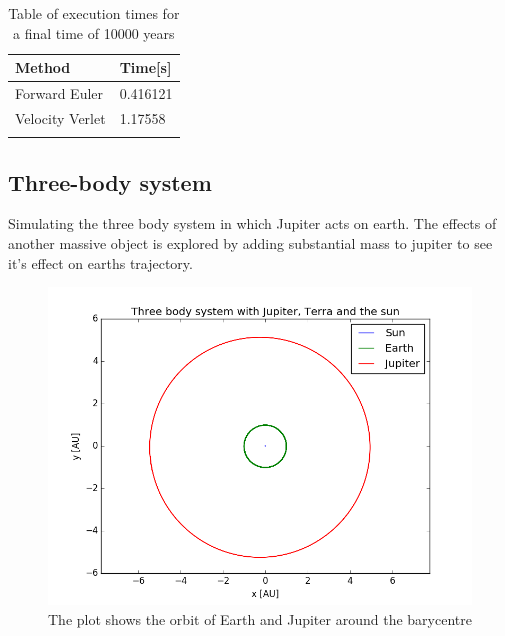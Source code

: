 \begin{table}
\centering
\caption{Table of execution times for a final time of 10000 years}
\begin{tabular}{|l|l|}
\hline
\textbf{Method}  & \textbf{Time[s]} \\
\hline
Forward Euler   & 0.416121 \\
\hline
Velocity Verlet & 1.17558 \\
\hline
\label{tab:comp-time}
\end{tabular}
\end{table}

\subsection{Three-body system}
Simulating the three body system in which Jupiter acts on earth. The effects of another massive object is explored by adding substantial mass to jupiter to see it's effect on earths trajectory.
 
\begin{figure}[H]
\includegraphics[scale=0.7]{figures/three_body}
\caption{The plot shows the orbit of Earth and Jupiter around the barycentre }\label{fig:three}
\end{figure}

